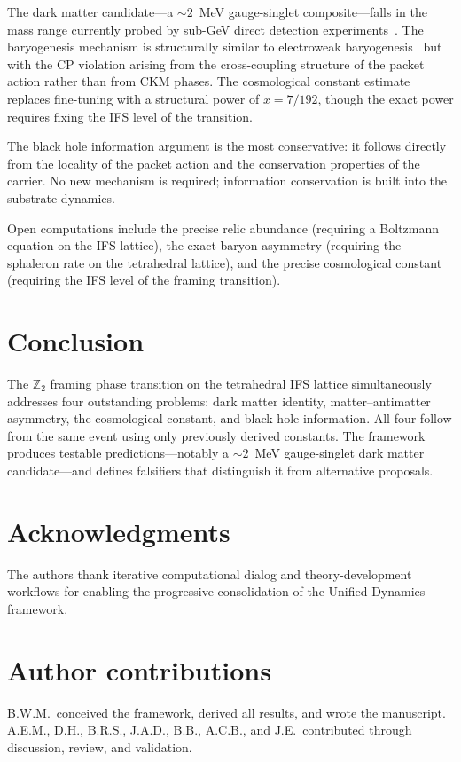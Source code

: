 \documentclass[11pt,twocolumn]{article}
\begin{document}
The dark matter candidate---a $\sim 2$~MeV gauge-singlet composite---falls in the mass range currently probed by sub-GeV direct detection experiments~\cite{essig2022}.
The baryogenesis mechanism is structurally similar to electroweak baryogenesis~\cite{kuzmin1985} but with the CP violation arising from the cross-coupling structure of the packet action rather than from CKM phases.
The cosmological constant estimate replaces fine-tuning with a structural power of $x=7/192$, though the exact power requires fixing the IFS level of the transition.

The black hole information argument is the most conservative: it follows directly from the locality of the packet action and the conservation properties of the carrier.
No new mechanism is required; information conservation is built into the substrate dynamics.

Open computations include the precise relic abundance (requiring a Boltzmann equation on the IFS lattice), the exact baryon asymmetry (requiring the sphaleron rate on the tetrahedral lattice), and the precise cosmological constant (requiring the IFS level of the framing transition).

\section{Conclusion}
\label{sec:conclusion}

The $\mathbb{Z}_2$ framing phase transition on the tetrahedral IFS lattice simultaneously addresses four outstanding problems: dark matter identity, matter--antimatter asymmetry, the cosmological constant, and black hole information.
All four follow from the same event using only previously derived constants.
The framework produces testable predictions---notably a $\sim 2$~MeV gauge-singlet dark matter candidate---and defines falsifiers that distinguish it from alternative proposals.

\section*{Acknowledgments}
The authors thank iterative computational dialog and theory-development workflows for enabling the progressive consolidation of the Unified Dynamics framework.

\section*{Author contributions}
B.W.M.\ conceived the framework, derived all results, and wrote the manuscript.
A.E.M., D.H., B.R.S., J.A.D., B.B., A.C.B., and J.E.\ contributed through discussion, review, and validation.
\end{document}
